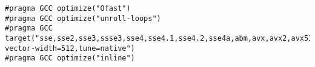 \documentclass[a4paper,landscape,twocolumn]{ctexart}
\begin{document}
\begin{lstlisting}[]
#pragma GCC optimize("Ofast")
#pragma GCC optimize("unroll-loops")
#pragma GCC target("sse,sse2,sse3,ssse3,sse4,sse4.1,sse4.2,sse4a,abm,avx,avx2,avx512f,prefer-vector-width=512,tune=native")
#pragma GCC optimize("inline")
\end{lstlisting}

%
%
%
%
%
%
\end{document}
